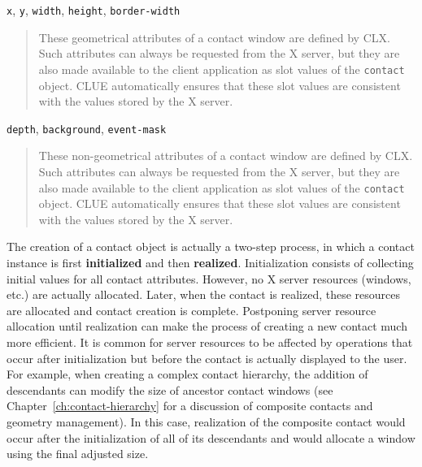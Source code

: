 \begin{flushright} \parbox[t]{6.125in}{
{\tt x}, {\tt y}, {\tt width}, {\tt height}, {\tt border-width}
\begin{quote}
These geometrical attributes of a contact window are defined by CLX. Such
attributes can always be requested from the X server, but they are also made
available to the client application as slot values of the {\tt contact}
object. CLUE automatically ensures that these slot values are consistent with
the values stored by the X server.
\end{quote}

}\end{flushright}

\begin{flushright} \parbox[t]{6.125in}{
{\tt depth}, {\tt background}, {\tt event-mask}
\begin{quote}
These non-geometrical attributes of a contact window are defined by CLX. Such
attributes can always be requested from the X server, but they are also made
available to the client application as slot values of the {\tt contact}
object. CLUE automatically ensures that these slot values are consistent with
the values stored by the X server.
\end{quote}

}\end{flushright}



The creation of a contact object is actually a two-step process, in which a
contact instance is first {\bf initialized} and 
then {\bf realized}. Initialization consists
of collecting initial values for all contact attributes. However, no X server
 resources (windows, etc.) are actually
allocated.  Later, when the contact is realized,
these resources are allocated and contact creation is complete. Postponing
server resource allocation until realization can make the process of creating a
new contact much more efficient. It is common for server resources to be
affected by operations that occur after initialization but before the contact is
actually displayed to the user. For example, when creating a complex contact
hierarchy, the addition of descendants can modify the size of ancestor contact
windows (see Chapter~\ref{ch:contact-hierarchy} for a discussion of composite
contacts and geometry management). In this case, realization of the composite
contact would occur after the initialization of all of its descendants and would
allocate a window using the final adjusted size.

